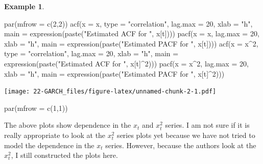 \documentclass[
]{book}
\newenvironment{Shaded}{\begin{snugshade}}{\end{snugshade}}
\newcommand{\AttributeTok}[1]{\textcolor[rgb]{0.77,0.63,0.00}{#1}}
\newcommand{\DecValTok}[1]{\textcolor[rgb]{0.00,0.00,0.81}{#1}}
\newcommand{\FunctionTok}[1]{\textcolor[rgb]{0.00,0.00,0.00}{#1}}
\newcommand{\NormalTok}[1]{#1}
\newcommand{\SpecialCharTok}[1]{\textcolor[rgb]{0.00,0.00,0.00}{#1}}
\newcommand{\StringTok}[1]{\textcolor[rgb]{0.31,0.60,0.02}{#1}}
\theoremstyle{definition}
\theoremstyle{definition}
\newtheorem{example}{Example}[chapter]
\theoremstyle{definition}
\theoremstyle{definition}
\theoremstyle{remark}
\begin{document}
\begin{example}
\begin{Shaded}
\begin{Highlighting}[]
\FunctionTok{par}\NormalTok{(}\AttributeTok{mfrow =} \FunctionTok{c}\NormalTok{(}\DecValTok{2}\NormalTok{,}\DecValTok{2}\NormalTok{))}
\FunctionTok{acf}\NormalTok{(}\AttributeTok{x =}\NormalTok{ x, }\AttributeTok{type =} \StringTok{"correlation"}\NormalTok{, }\AttributeTok{lag.max =} \DecValTok{20}\NormalTok{, }\AttributeTok{xlab =} 
    \StringTok{"h"}\NormalTok{, }\AttributeTok{main =} \FunctionTok{expression}\NormalTok{(}\FunctionTok{paste}\NormalTok{(}\StringTok{"Estimated ACF for "}\NormalTok{, }
\NormalTok{    x[t])))}
\FunctionTok{pacf}\NormalTok{(}\AttributeTok{x =}\NormalTok{ x, }\AttributeTok{lag.max =} \DecValTok{20}\NormalTok{, }\AttributeTok{xlab =} \StringTok{"h"}\NormalTok{, }\AttributeTok{main =} 
    \FunctionTok{expression}\NormalTok{(}\FunctionTok{paste}\NormalTok{(}\StringTok{"Estimated PACF for "}\NormalTok{, x[t])))}
\FunctionTok{acf}\NormalTok{(}\AttributeTok{x =}\NormalTok{ x}\SpecialCharTok{\^{}}\DecValTok{2}\NormalTok{, }\AttributeTok{type =} \StringTok{"correlation"}\NormalTok{, }\AttributeTok{lag.max =} \DecValTok{20}\NormalTok{, }\AttributeTok{xlab =} 
    \StringTok{"h"}\NormalTok{, }\AttributeTok{main =} \FunctionTok{expression}\NormalTok{(}\FunctionTok{paste}\NormalTok{(}\StringTok{"Estimated ACF for "}\NormalTok{, }
\NormalTok{    x[t]}\SpecialCharTok{\^{}}\DecValTok{2}\NormalTok{)))}
\FunctionTok{pacf}\NormalTok{(}\AttributeTok{x =}\NormalTok{ x}\SpecialCharTok{\^{}}\DecValTok{2}\NormalTok{, }\AttributeTok{lag.max =} \DecValTok{20}\NormalTok{, }\AttributeTok{xlab =} \StringTok{"h"}\NormalTok{, }\AttributeTok{main =} 
    \FunctionTok{expression}\NormalTok{(}\FunctionTok{paste}\NormalTok{(}\StringTok{"Estimated PACF for "}\NormalTok{, x[t]}\SpecialCharTok{\^{}}\DecValTok{2}\NormalTok{)))}
\end{Highlighting}
\end{Shaded}

\texttt{[image: 22-GARCH\_files/figure-latex/unnamed-chunk-2-1.pdf]}

\begin{Shaded}
\begin{Highlighting}[]
\FunctionTok{par}\NormalTok{(}\AttributeTok{mfrow =} \FunctionTok{c}\NormalTok{(}\DecValTok{1}\NormalTok{,}\DecValTok{1}\NormalTok{))}
\end{Highlighting}
\end{Shaded}

The above plots show dependence in the \(x_t\) and \(x_t^2\) series. I am not sure if it is really appropriate to look at the \(x_t^2\) series plots yet because we have not tried to model the dependence in the \(x_t\) series. However, because the authors look at the \(x_t^2\), I still constructed the plots here.


\end{example}
\end{document}
